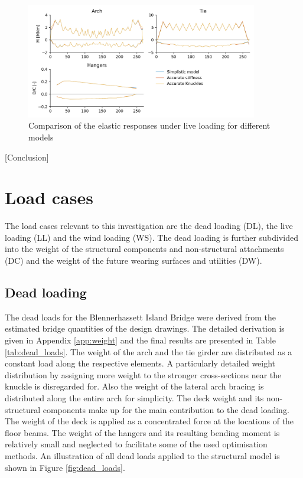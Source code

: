 \begin{figure}[H]
    \centering
    \includegraphics[width=0.9\textwidth]{calculations/model comparison/live_loading.png}
    \caption{Comparison of the elastic responses under live loading for different models}
    \label{fig:model_comparison}
\end{figure}

[Conclusion]

\newpage
\section{Load cases} \label{sec:met_loads}
The load cases relevant to this investigation are the dead loading (DL), the live loading (LL) and the wind loading (WS). The dead loading is further subdivided into the weight of the structural components and non-structural attachments (DC) and the weight of the future wearing surfaces and utilities (DW).

\subsection{Dead loading}
The dead loads for the Blennerhassett Island Bridge were derived from the estimated bridge quantities of the design drawings. The detailed derivation is given in Appendix \ref{app:weight} and the final results are presented in Table \ref{tab:dead_loads}. The weight of the arch and the tie girder are distributed as a constant load along the respective elements. A particularly detailed weight distribution by assigning more weight to the stronger cross-sections near the knuckle is disregarded for. Also the weight of the lateral arch bracing is distributed along the entire arch for simplicity. The deck weight and its non-structural components make up for the main contribution to the dead loading. The weight of the deck is applied as a concentrated force at the locations of the floor beams. The weight of the hangers and its resulting bending moment is relatively small and neglected to facilitate some of the used optimisation methods. An illustration of all dead loads applied to the structural model is shown in Figure \ref{fig:dead_loads}.

